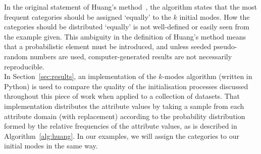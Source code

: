 In the original statement of Huang's method~\cite{Huang98}, the algorithm states
that the most frequent categories should be assigned `equally' to the \(k\) 
initial modes. How the categories should be distributed `equally' is not 
well-defined or easily seen from the example given. This ambiguity in the 
definition of Huang's method means that a probabilistic element must be 
introduced, and unless seeded pseudo-random numbers are used, computer-generated results are not necessarily reproducible.\\

In Section~\ref{sec:results}, an implementation of the \(k\)-modes algorithm 
(written in Python) is used to compare the quality of the initialisation 
processes discussed throughout this piece of work when applied to a collection 
of datasets. That implementation distributes the attribute values by taking a
sample from each attribute domain (with replacement) according to the 
probability distribution formed by the relative frequencies of the attribute
values, as is described in Algorithm~\ref{alg:huang}. In our examples, we will
assign the categories to our initial modes in the same way.\\

